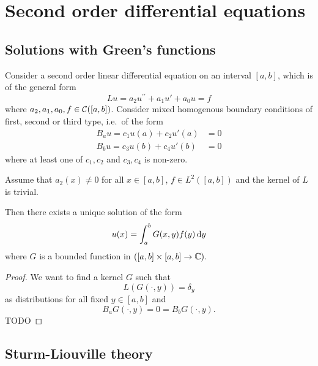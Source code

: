 \section{Second order differential equations}
\subsection{Solutions with Green's functions}
\begin{proposition}
Consider a second order linear differential equation on an interval $[a,b]$, which is of the general form
\[ Lu = a_2u^{\prime\prime} + a_1u' + a_0u = f \]
where $a_2,a_1, a_0, f\in \operatorname{\mathcal{C}}([a,b])$.
Consider mixed homogenous boundary conditions of first, second or third type, i.e.\ of the form
\begin{align*}
B_au = c_1 u(a) + c_2 u'(a) &= 0 \\
B_bu = c_3 u(b) + c_4 u'(b) &= 0
\end{align*}
where at least one of $c_1,c_2$ and $c_3,c_4$ is non-zero.

Assume that $a_2(x) \neq 0$ for all $x\in [a,b]$, $f\in L^2([a,b])$ and the kernel of $L$ is trivial.

Then there exists a unique solution of the form
\[ u(x) = \int_{a}^b G(x,y)f(y)\operatorname{d \!}{y} \]
where $G$ is a bounded function in $([a,b]\times [a,b] \to \mathbb{C})$.
\end{proposition}
\begin{proof}
We want to find a kernel $G$ such that
\[ L(G(\cdot, y)) = \delta_y \]
as distributions for all fixed $y\in [a,b]$ and
\[ B_aG(\cdot, y) = 0 = B_bG(\cdot, y). \]
TODO
\end{proof}

\subsection{Sturm-Liouville theory}
